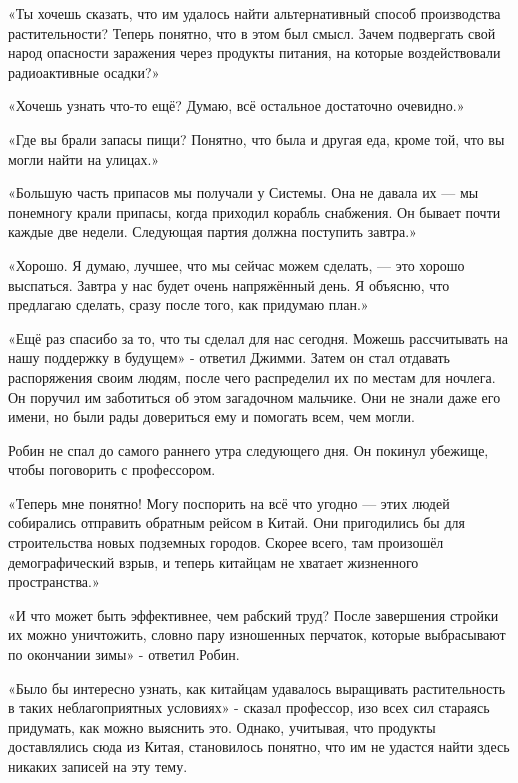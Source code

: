 \documentclass[a4paper,12pt]{book}
\begin{document}
\par
«Ты хочешь сказать, что им удалось найти альтернативный способ производства растительности? Теперь понятно, что в этом был смысл. Зачем подвергать свой народ опасности заражения через продукты питания, на которые воздействовали радиоактивные осадки?»
\par
«Хочешь узнать что-то ещё? Думаю, всё остальное достаточно очевидно.»
\par
«Где вы брали запасы пищи? Понятно, что была и другая еда, кроме той, что вы могли найти на улицах.»
\par
«Большую часть припасов мы получали у Системы. Она не давала их — мы понемногу крали припасы, когда приходил корабль снабжения. Он бывает почти каждые две недели. Следующая партия должна поступить завтра.»
\par
«Хорошо. Я думаю, лучшее, что мы сейчас можем сделать, — это хорошо выспаться. Завтра у нас будет очень напряжённый день. Я объясню, что предлагаю сделать, сразу после того, как придумаю план.»
\par
«Ещё раз спасибо за то, что ты сделал для нас сегодня. Можешь рассчитывать на нашу поддержку в будущем» - ответил Джимми. Затем он стал отдавать распоряжения своим людям, после чего распределил их по местам для ночлега. Он поручил им заботиться об этом загадочном мальчике. Они не знали даже его имени, но были рады довериться ему и помогать всем, чем могли.\\
\par
Робин не спал до самого раннего утра следующего дня. Он покинул убежище, чтобы поговорить с профессором.
\par
«Теперь мне понятно! Могу поспорить на всё что угодно — этих людей собирались отправить обратным рейсом в Китай. Они пригодились бы для строительства новых подземных городов. Скорее всего, там произошёл демографический взрыв, и теперь китайцам не хватает жизненного пространства.»
\par
«И что может быть эффективнее, чем рабский труд? После завершения стройки их можно уничтожить, словно пару изношенных перчаток, которые выбрасывают по окончании зимы» - ответил Робин.
\par
«Было бы интересно узнать, как китайцам удавалось выращивать растительность в таких неблагоприятных условиях» - сказал профессор, изо всех сил стараясь придумать, как можно выяснить это. Однако, учитывая, что продукты доставлялись сюда из Китая, становилось понятно, что им не удастся найти здесь никаких записей на эту тему.
\par
\end{document}
